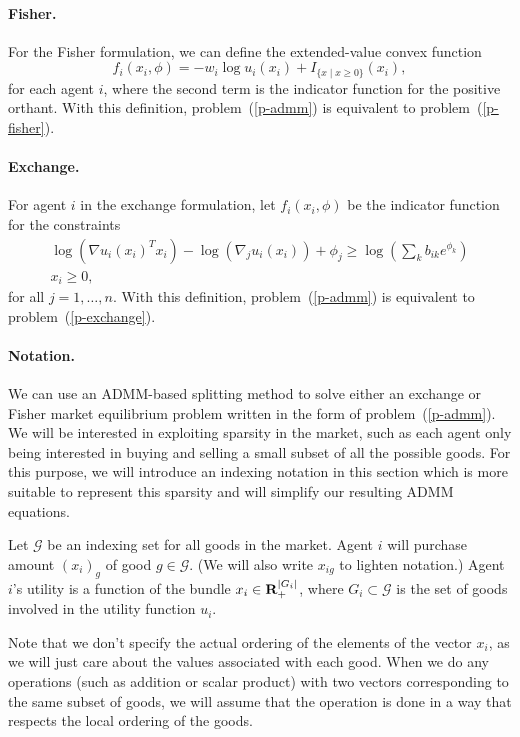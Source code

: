 \documentclass[12pt]{article}
\begin{document}
\paragraph{Fisher.}
For the Fisher formulation, we can define the extended-value convex function
\[
f_i(x_i, \phi) = -w_i \log u_i(x_i) + I_{\lbrace x \mid x \geq 0 \rbrace}(x_i),
\]
for each agent $i$,
where the second term is the indicator function for the positive orthant.
With this definition, problem~(\ref{p-admm}) is equivalent to
problem~(\ref{p-fisher}).

\paragraph{Exchange.}
For agent $i$ in the exchange formulation, let $f_i(x_i, \phi)$ be the
indicator function for the constraints
\[
\begin{array}{c}
\log(\nabla u_i(x_i)^T x_i) - \log(\nabla_j u_i(x_i)) + \phi_j \geq  \log\left(\sum_k b_{ik} e^{\phi_{k}}\right)\\
x_i \geq 0,
\end{array}
\]
for all $j=1,\ldots,n$.
With this definition, problem~(\ref{p-admm}) is equivalent to problem~(\ref{p-exchange}).


\paragraph{Notation.}

We can use an ADMM-based splitting method \cite{boyd2011distributed} to solve
either an exchange or Fisher market equilibrium problem written in the form of
problem~(\ref{p-admm}). We will be interested in exploiting sparsity in the
market, such as each agent only being interested in buying and selling a small
subset of all the possible goods. For this purpose, we will introduce an
indexing notation in this section which is more suitable to represent this
sparsity and will simplify our resulting ADMM equations.

Let $\mathcal{G}$ be an indexing set for all goods
in the market.
Agent $i$ will purchase amount $(x_i)_g$ of good $g \in \mathcal{G}$.
(We will also write $x_{ig}$ to lighten notation.)
Agent $i$'s utility is a function of the bundle $x_i \in {\mbox{\bf R}}_{+}^{|G_i|}$,
where $G_i \subset \mathcal{G}$ is the set of goods involved in the utility
function $u_i$.

Note that we don't specify the actual ordering of the elements
of the vector $x_i$, as we will just care about the values associated with
each good.
When we do any operations (such as addition or scalar product) with
two vectors corresponding to the same subset of goods, we will
assume that the operation is done in a way that respects the local ordering of
the goods.
\end{document}
